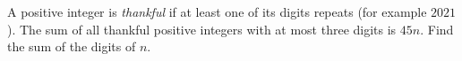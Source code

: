 A positive integer is \emph{thankful} if at least one of its digits repeats (for example $2021$). The sum of all thankful positive integers with at most three digits is $45n$. Find the sum of the digits of $n$.
